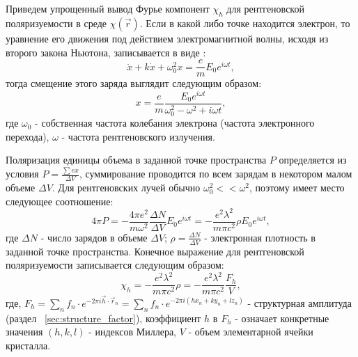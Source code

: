   \section{ }%
  \label{sec:polarizability}

Приведем упрощенный вывод Фурье компонент  $\chi_h$  для рентгеновской
поляризуемости в среде  $\chi(\vec{r})$. Если в какой либо точке находится электрон,
то уравнение его движения под действием электромагнитной волны,
исходя из второго закона Ньютона, записывается в виде \cite{iveronova1972}:
\begin{equation}
  \ddot{x}+ k\dot{x} + \omega_0^2 x = \frac{e}{m}E_0e^{i\omega t},
 \end{equation}
тогда смещение этого заряда выглядит следующим образом:
\begin{equation}
  x = \frac{e}{m} \frac{E_0e^{i\omega t}}{\omega_0^2 - \omega^2+i\omega t},
 \end{equation}
где $\omega_0 $ - собственная частота колебания электрона (частота электронного перехода), $\omega$ - частота рентгеновского излучения.

Поляризация единицы объема в заданной точке пространства $P$ определяется из условия
$P = \frac{\sum e x}{\Delta V}$, суммирование проводится по всем зарядам в
некотором малом объеме  $\Delta V$. Для рентгеновских лучей обычно $\omega_0^2 << \omega^2$, поэтому имеет место
следующее соотношение:
\begin{equation}
  4\pi P = - \frac{4\pi e^2}{m\omega^2}\frac{\Delta N}{\Delta V} E_0 e^{i\omega t} = -\frac{e^2 \lambda^2}{m \pi c^2} \rho E_0 e^{i\omega t},
 \end{equation}
где $\Delta N$ - число зарядов в объеме $\Delta V$;
$\rho = \frac{\Delta N}{\Delta V}$ - электронная плотность в заданной точке пространства. Конечное выражение
для рентгеновской поляризуемости записывается следующим образом:
\begin{equation}
  \chi_h = -\frac{e^2 \lambda^2}{m \pi c^2}  \rho = -\frac{e^2 \lambda^2}{m \pi c^2} \frac{F_h}{V},
 \end{equation}
 где, $ F_h = \sum_{n} f_n \cdot e^{-2\pi i\vec{h}\cdot \vec{r}_n}= \sum_{n} f_n \cdot e^{- 2 \pi i (hx_n+ky_n+lz_n)}$ -
 структурная амплитуда (раздел ~\ref{sec:structure_factor}),
 коэффициент $h$ в $F_h$ - означает конкретные значения $(h,k,l)$ - индексов Миллера, $V$ - объем элементарной ячейки кристалла.
